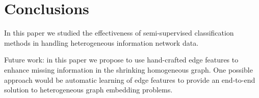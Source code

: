 \section{Conclusions}
In this paper we studied the effectiveness of semi-supervised classification methods in handling heterogeneous information network data.

Future work: in this paper we propose to use hand-crafted edge features to enhance missing information in the shrinking homogeneous graph. One possible approach would be automatic learning of edge features to provide an end-to-end solution to heterogeneous graph embedding problems.  
\label{sec:conclusion}
